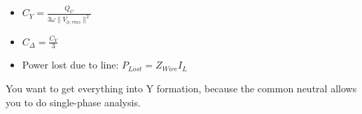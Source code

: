 \begin{itemize}[noitemsep, nolistsep]
	\item $C_{Y} = \frac{Q_{C}}{3 \omega \lVert V_{\phi,rms} \rVert^{2}}$
	\item $C_{\Delta} = \frac{C_{Y}}{3}$
	\item Power lost due to line: $P_{Lost}=Z_{Wire}I_{L}$
\end{itemize}
You want to get everything into Y formation, because the common neutral allows you to do single-phase analysis.
\vspace{-5mm}